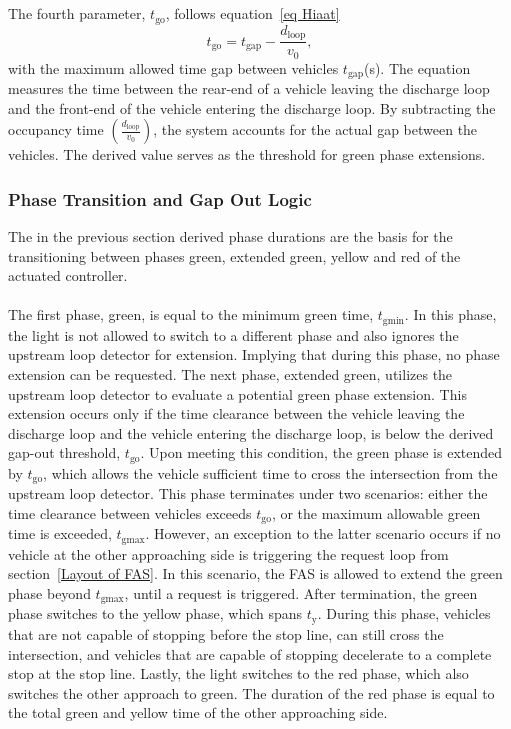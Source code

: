 \\\\
The fourth parameter, \(t_\text{go}\), follows equation~\ref{eq Hiaat} 
\begin{equation}
\label{eq Hiaat}
    t_\text{go} = t_\text{gap}-\frac{d_\text{loop}}{v_0},
\end{equation}
with the maximum allowed time gap between vehicles \(t_\text{gap}\)(s). The equation measures the time between the rear-end of a vehicle leaving the discharge loop and the front-end of the vehicle entering the discharge loop. By subtracting the occupancy time \(\left(\frac{d_\text{loop}}{v_0}\right)\), the system accounts for the actual gap between the vehicles. The derived value serves as the threshold for green phase extensions.  

\subsubsection{Phase Transition and Gap Out Logic}
\label{Phase altering system}
The in the previous section derived phase durations are the basis for the transitioning between phases green, extended green, yellow and red of the actuated controller. \\\\
The first phase, green, is equal to the minimum green time, \(t_\text{gmin}\). In this phase, the light is not allowed to switch to a different phase and also ignores the upstream loop detector for extension. Implying that during this phase, no phase extension can be requested.
The next phase, extended green, utilizes the upstream loop detector to evaluate a potential green phase extension. This extension occurs only if the time clearance between the vehicle leaving the discharge loop and the vehicle entering the discharge loop, is below the derived gap-out threshold, \(t_\text{go}\). Upon meeting this condition, the green phase is extended by \(t_\text{go}\), which allows the vehicle sufficient time to cross the intersection from the upstream loop detector. This phase terminates under two scenarios: either the time clearance between vehicles exceeds \(t_\text{go}\), or the maximum allowable green time is exceeded, \(t_\text{gmax}\). However, an exception to the latter scenario occurs if no vehicle at the other approaching side is triggering the request loop from section~\ref{Layout of FAS}. In this scenario, the FAS is allowed to extend the green phase beyond \(t_\text{gmax}\), until a request is triggered. After termination, the green phase switches to the yellow phase, which spans \(t_\text{y}\). During this phase, vehicles that are not capable of stopping before the stop line, can still cross the intersection, and vehicles that are capable of stopping decelerate to a complete stop at the stop line. Lastly, the light switches to the red phase, which also switches the other approach to green. The duration of the red phase is equal to the total green and yellow time of the other approaching side. 

